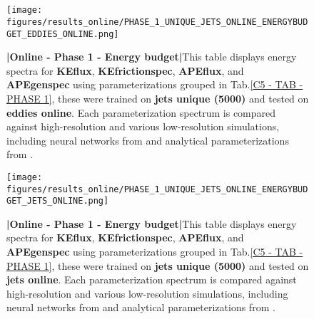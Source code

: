 %
%
\newpage
\thispagestyle{empty}
\part{}
\newpage

%
%
\begin{figure}[H]
    \centering
    \texttt{[image: figures/results\_online/PHASE\_1\_UNIQUE\_JETS\_ONLINE\_ENERGYBUDGET\_EDDIES\_ONLINE.png]}
    \caption{\textbf{|}\textcolor{section_color}{\textbf{Online - Phase 1 - Energy budget}}\textbf{|}This table displays energy spectra for \textbf{KEflux}, \textbf{KEfrictionspec}, \textbf{APEflux}, and \textbf{APEgenspec} using parameterizations grouped in Tab.\ref{C5 - TAB - PHASE 1}, these were trained on \textbf{jets unique (5000)} and tested on \textbf{eddies online}. Each parameterization spectrum is compared against high-resolution and various low-resolution simulations, including neural networks from \cite{Benchmarking} and analytical parameterizations from \cite{ClosureAnalytical2, ClosureAnalytical51, ClosureDataDrivenZanna}.}
    \label{APP - ONLINE - PHASE 1 - ENERGY BUDGET -  JETS UNIQUE 5000 and EDDIES ONLINE}
\end{figure}

\newpage


\begin{figure}[H]
    \centering
    \texttt{[image: figures/results\_online/PHASE\_1\_UNIQUE\_JETS\_ONLINE\_ENERGYBUDGET\_JETS\_ONLINE.png]}
    \caption{\textbf{|}\textcolor{section_color}{\textbf{Online - Phase 1 - Energy budget}}\textbf{|}This table displays energy spectra for \textbf{KEflux}, \textbf{KEfrictionspec}, \textbf{APEflux}, and \textbf{APEgenspec} using parameterizations grouped in Tab.\ref{C5 - TAB - PHASE 1}, these were trained on \textbf{jets unique (5000)} and tested on \textbf{jets online}. Each parameterization spectrum is compared against high-resolution and various low-resolution simulations, including neural networks from \cite{Benchmarking} and analytical parameterizations from \cite{ClosureAnalytical2, ClosureAnalytical51, ClosureDataDrivenZanna}.
}
    \label{APP - ONLINE - PHASE 1 - ENERGY BUDGET -  JETS UNIQUE 5000 and JETS ONLINE}
\end{figure}

